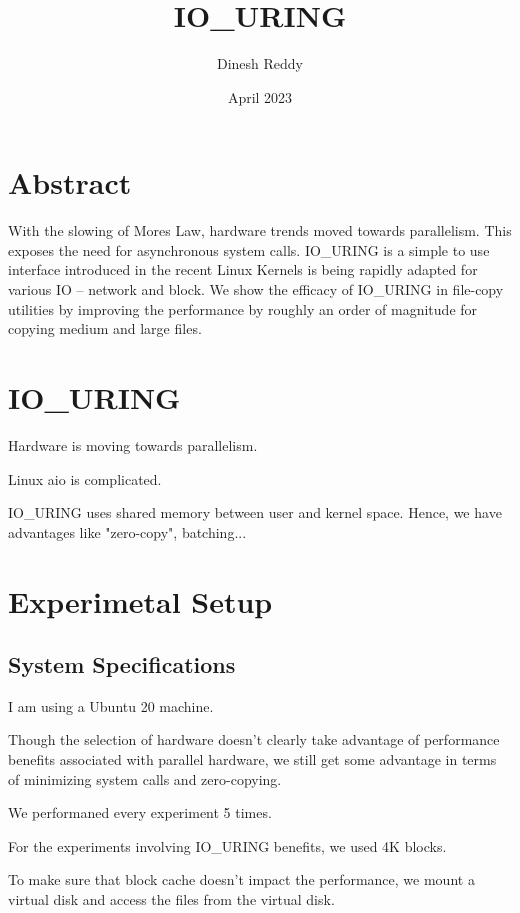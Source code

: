 \documentclass{article}
\title{IO\_URING}
\author{Dinesh Reddy}
\date{April 2023}
\begin{document}
\maketitle
\section{Abstract}
With the slowing of Mores Law, hardware trends moved towards parallelism. This exposes the need for asynchronous
system calls. IO\_URING is a simple to use interface introduced in the recent Linux Kernels is being 
rapidly adapted for various IO -- network and block. We show the efficacy of IO\_URING in file-copy 
utilities by improving the performance by roughly an order of magnitude for copying medium and large files.

\section{IO\_URING}

Hardware is moving towards parallelism.

Linux aio is complicated.

IO\_URING uses shared memory between user and kernel space. Hence, we have advantages like "zero-copy", batching...

\section{Experimetal Setup}
\subsection{System Specifications}
I am using a Ubuntu 20 machine.

Though the selection of hardware doesn't clearly take advantage of performance benefits associated
with parallel hardware, we still get some advantage in terms of minimizing system calls and zero-copying.

We performaned every experiment 5 times. 

For the experiments involving IO\_URING benefits, we used 4K blocks. 

To make sure that block cache doesn't impact the performance, we mount a virtual disk and access 
the files from the virtual disk.
\end{document}
